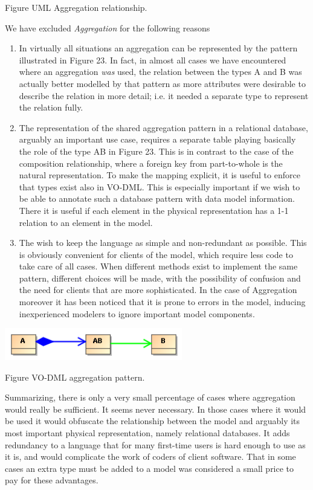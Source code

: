 \documentclass[10pt,a4paper]{ivoa}
\begin{document}
Figure UML Aggregation relationship.

We have excluded \emph{Aggregation} for the following reasons

\begin{enumerate}
\def\labelenumi{\arabic{enumi}.}
\item
  In virtually all situations an aggregation can be represented by the
  pattern illustrated in Figure 23. In fact, in almost all cases we have
  encountered where an aggregation \emph{was} used, the relation between
  the types A and B was actually better modelled by that pattern as more
  attributes were desirable to describe the relation in more detail;
  i.e. it needed a separate type to represent the relation fully.
\item
  The representation of the shared aggregation pattern in a relational
  database, arguably an important use case, requires a separate table
  playing basically the role of the type AB in Figure 23. This is in
  contrast to the case of the composition relationship, where a foreign
  key from part-to-whole is the natural representation. To make the
  mapping explicit, it is useful to enforce that types exist also in
  VO-DML. This is especially important if we wish to be able to annotate
  such a database pattern with data model information. There it is
  useful if each element in the physical representation has a 1-1
  relation to an element in the model.
\item
  The wish to keep the language as simple and non-redundant as possible.
  This is obviously convenient for clients of the model, which require
  less code to take care of all cases. When different methods exist to
  implement the same pattern, different choices will be made, with the
  possibility of confusion and the need for clients that are more
  sophisticated. In the case of Aggregation moreover it has been noticed
  that it is prone to errors in the model, inducing inexperienced
  modelers to ignore important model components.
\end{enumerate}

\includegraphics[width=3.0478in,height=0.54925in]{./media/image31.png}

Figure VO-DML aggregation pattern.

Summarizing, there is only a very small percentage of cases where
aggregation would really be sufficient. It seems never necessary. In
those cases where it would be used it would obfuscate the relationship
between the model and arguably its most important physical
representation, namely relational databases. It adds redundancy to a
language that for many first-time users is hard enough to use as it is,
and would complicate the work of coders of client software. That in some
cases an extra type must be added to a model was considered a small
price to pay for these advantages.
\end{document}
